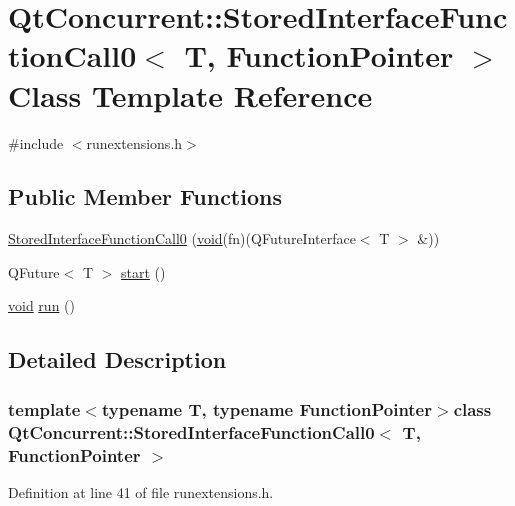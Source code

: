 \hypertarget{class_qt_concurrent_1_1_stored_interface_function_call0}{\section{\-Qt\-Concurrent\-:\-:\-Stored\-Interface\-Function\-Call0$<$ \-T, \-Function\-Pointer $>$ \-Class \-Template \-Reference}
\label{class_qt_concurrent_1_1_stored_interface_function_call0}
}


{\ttfamily \#include $<$runextensions.\-h$>$}

\subsection*{\-Public \-Member \-Functions}
\begin{DoxyCompactItemize}
\item 
\hyperlink{class_qt_concurrent_1_1_stored_interface_function_call0_a128bcc2e778675fbc138f3220eccdd30}{\-Stored\-Interface\-Function\-Call0} (\hyperlink{group___u_a_v_objects_plugin_ga444cf2ff3f0ecbe028adce838d373f5c}{void}(fn)(\-Q\-Future\-Interface$<$ \-T $>$ \&))
\item 
\-Q\-Future$<$ \-T $>$ \hyperlink{class_qt_concurrent_1_1_stored_interface_function_call0_a1a695cd6ebe4a05504b5bcdca972e993}{start} ()
\item 
\hyperlink{group___u_a_v_objects_plugin_ga444cf2ff3f0ecbe028adce838d373f5c}{void} \hyperlink{class_qt_concurrent_1_1_stored_interface_function_call0_a647bd9e33e528df7a45f933efa4c0d14}{run} ()
\end{DoxyCompactItemize}


\subsection{\-Detailed \-Description}
\subsubsection*{template$<$typename T, typename Function\-Pointer$>$class Qt\-Concurrent\-::\-Stored\-Interface\-Function\-Call0$<$ T, Function\-Pointer $>$}



\-Definition at line 41 of file runextensions.\-h.



